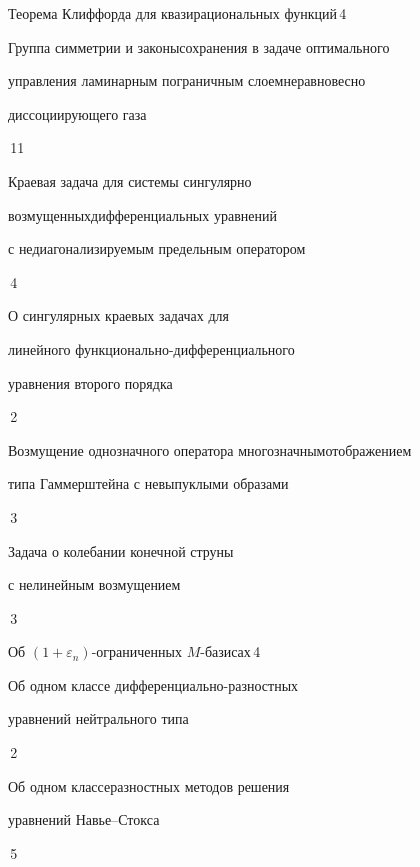 

{Теорема Клиффорда для квазирациональных функций}{\No\,4}




{Группа симметрии и законы\newline сохранения в задаче оптимального 


управления ламинарным пограничным слоем\newline неравновесно 


диссоциирующего газа}{\No\,11}




{Краевая задача для системы сингулярно


возмущенных\newline дифференциальных уравнений


с недиагонализируемым предельным оператором}{\No\,4}




{О сингулярных краевых задачах для\newline


линейного функционально-дифференциального


уравнения второго порядка}{\No\,2}




{Возмущение однозначного оператора многозначным\newline отображением


типа Гаммерштейна с невыпуклыми образами}{\No\,3}






{Задача о колебании конечной струны 


с нелинейным возмущением}{\No\,3}




{Об $(1+\varepsilon_n)$-ограниченных $M$-базисах}{\No\,4}




{Об одном классе дифференциально-разностных


уравнений нейтрального типа}{\No\,2}




{Об одном классе\newline разностных методов решения


уравнений Навье--Стокса}{\No\,5}


